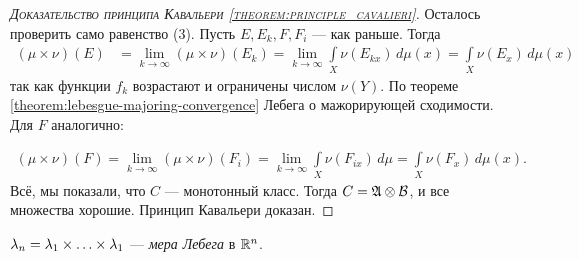 \begin{proof}[\normalfont\textsc{Доказательство принципа Кавальери \ref{theorem:principle_cavalieri}}]
 Осталось проверить само равенство (3). Пусть $E, E_k, F, F_i$ --- как раньше. Тогда \begin{align*}
  (\mu \times \nu)(E) &= \lim_{k \to \infty} (\mu \times \nu)(E_k) = \lim_{k \to \infty} \int\limits_{X} \nu(E_{kx}) \, d\mu   (x) =  \int\limits_{X} \nu(E_x)  \, d\mu  (x)
 \end{align*} так как функции $f_k$ возрастают и ограничены числом $\nu(Y)$. По теореме \ref{theorem:lebesgue-majoring-convergence} Лебега о мажорирующей сходимости. Для $F$ аналогично:

 \begin{align*}
  (\mu \times \nu)(F)  = \lim_{k \to \infty} (\mu \times \nu)(F_i) = \lim_{k \to \infty} \int\limits_{X} \nu(F_{ix}) \, d\mu = \int\limits_{X} \nu(F_x) \, d\mu(x)
 .\end{align*} Всё, мы показали, что $C$ --- монотонный класс. Тогда $C = \mathfrak{A} \otimes \mathcal{B}$, и все множества хорошие. Принцип Кавальери доказан.
\end{proof}
\begin{df}
 $\lambda_n = \lambda_1 \times \ldots \times \lambda_{1}$ --- \textit{мера Лебега} в $\mathbb{R}^{n}$.
\end{df}

